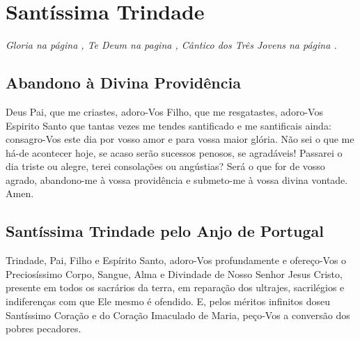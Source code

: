 \section{Santíssima Trindade}\label{trindade}

\emph{Gloria na página \pageref{gloria}, Te Deum na pagina \pageref{tedeum}, Cântico dos Três Jovens na página \pageref{benedicite}.}

\subsection{Abandono à Divina Providência}

 Deus Pai, que me criastes, adoro-Vos Filho, que me resgatastes, adoro-Vos Espirito Santo que tantas vezes me tendes santificado e me santificais ainda: consagro-Vos este dia por vosso amor e para vossa maior glória. Não sei o que me há-de acontecer hoje, se acaso serão sucessos penosos, se agradáveis! Passarei o dia triste ou alegre, terei consolações ou angústias? Será o que for de vosso agrado, abandono-me à vossa providência e submeto-me à vossa divina vontade. Amen.

\subsection{Santíssima Trindade pelo Anjo de Portugal}\label{fatimatrindade}
 Trindade, Pai, Filho e Espírito Santo, adoro-Vos profundamente e ofereço-Vos o Preciosíssimo Corpo, Sangue, Alma e Divindade de Nosso Senhor Jesus Cristo, presente em todos os sacrários da terra, em reparação dos ultrajes, sacrilégios e indiferenças com que Ele mesmo é ofendido. E, pelos méritos infinitos doseu Santíssimo Coração e do Coração Imaculado de Maria, peço-Vos a conversão dos pobres pecadores.
